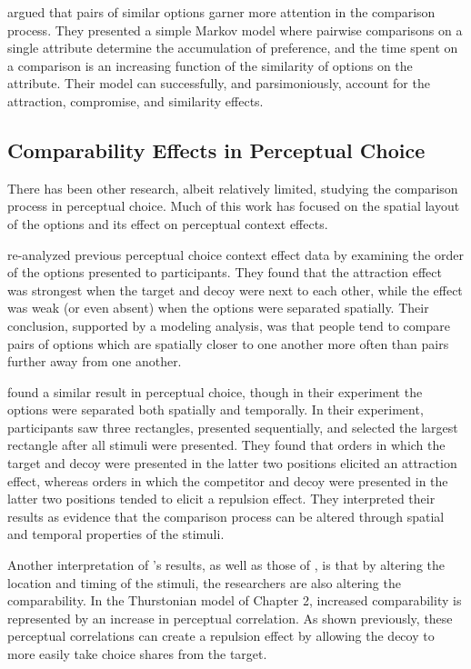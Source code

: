 \textcite{trueblood2022attentional} argued that pairs of similar options garner more attention in the comparison process. They presented a simple Markov model where pairwise comparisons on a single attribute determine the accumulation of preference, and the time spent on a comparison is an increasing function of the similarity of options on the attribute. Their model can successfully, and parsimoniously, account for the attraction, compromise, and similarity effects.

\subsection{Comparability Effects in Perceptual Choice}
There has been other research, albeit relatively limited, studying the comparison process in perceptual choice. Much of this work has focused on the spatial layout of the options and its effect on perceptual context effects.

\textcite{trueblood2022attentional} re-analyzed previous perceptual choice context effect data \parencite{trueblood2015fragile} by examining the order of the options presented to participants. They found that the attraction effect was strongest when the target and decoy were next to each other, while the effect was weak (or even absent) when the options were separated spatially. Their conclusion, supported by a modeling analysis, was that people tend to compare pairs of options which are spatially closer to one another more often than pairs further away from one another. 

\textcite{evansImpactPresentationOrder2021} found a similar result in perceptual choice, though in their experiment the options were separated both spatially and temporally. In their experiment, participants saw three rectangles, presented sequentially, and selected the largest rectangle after all stimuli were presented. They found that orders in which the target and decoy were presented in the latter two positions elicited an attraction effect, whereas orders in which the competitor and decoy were presented in the latter two positions tended to elicit a repulsion effect. They interpreted their results as evidence that the comparison process can be altered through spatial and temporal properties of the stimuli.

Another interpretation of \textcite{evansImpactPresentationOrder2021}'s results, as well as those of \textcite{trueblood2022attentional}, is that by altering the location and timing of the stimuli, the researchers are also altering the comparability. In the Thurstonian model of Chapter 2, increased comparability is represented by an increase in perceptual correlation. As shown previously, these perceptual correlations can create a repulsion effect by allowing the decoy to more easily take choice shares from the target.


